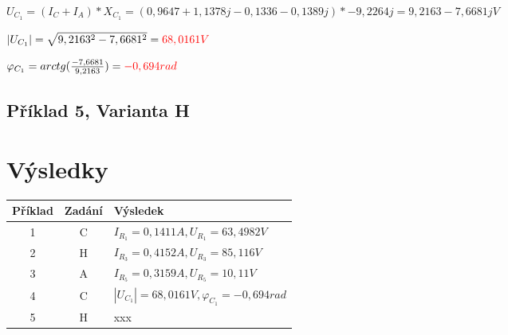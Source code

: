 \documentclass{article}
\begin{document}
\vspace{1pc}
\centerline{$U_{C_1}=(I_C+I_A)*X_{C_1} = (0,9647+1,1378j -0,1336 - 0,1389j) *  -9,2264j = 9,2163-7,6681jV$}
\centerline{$|U_{C_1}|=\sqrt{9,2163^2-7,6681^2}=\textcolor{red}{68,0161V}$}
\centerline{$\varphi_{C_1} = arctg(\frac{-7,6681}{9,2163}) = \textcolor{red}{-0,694rad}$}
\clearpage
\subsection{Příklad 5, Varianta H}

\clearpage

\section{Výsledky}
\begin{tabular}{|c|c|l|}
\hline
Příklad & Zadání & Výsledek \\ \hline
1 & C & $I_{R_1} = 0,1411A, U_{R_1} = 63,4982V$ \\ \hline
2 & H & $I_{R_3} = 0,4152A, U_{R_3} = 85,116V$ \\ \hline
3 & A & $I_{R_5} = 0,3159A, U_{R_5} = 10,11V$ \\ \hline
4 & C & $|U_{C_1}|=68,0161V, \varphi_{C_1}= -0,694rad$ \\ \hline 
5 & H & xxx \\ \hline
\end{tabular}
\end{document}
